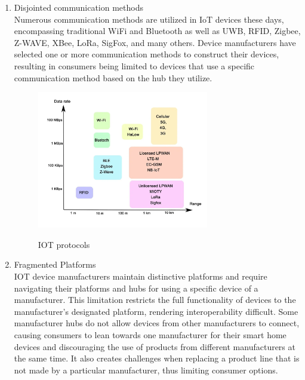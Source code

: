 \begin{enumerate}[label=\alph*]
    \item Disjointed communication methods\\
          Numerous communication methods are utilized in IoT devices these days, encompassing traditional WiFi and Bluetooth as well as UWB, RFID, Zigbee, Z-WAVE, XBee, LoRa, SigFox, and many others. Device manufacturers have selected one or more communication methods to construct their devices, resulting in consumers being limited to devices that use a specific communication method based on the hub they utilize.\\

          \begin{figure}[ht]
              \includegraphics[width=7.5cm]{imgs/introduction/iot-protocols.png}
              \cite{iot-protocols}
              \caption{IOT protocols}
              \renewcommand{\thefigure}{\thesubsection.\arabic{figure}}
          \end{figure}

    \item Fragmented Platforms\\
          IOT device manufacturers maintain distinctive platforms and require navigating their platforms and hubs for using a specific device of a manufacturer. This limitation restricts the full functionality of devices to the manufacturer's designated platform, rendering interoperability difficult. Some manufacturer hubs do not allow devices from other manufacturers to connect, causing consumers to lean towards one manufacturer for their smart home devices and discouraging the use of products from different manufacturers at the same time. It also creates challenges when replacing a product line that is not made by a particular manufacturer, thus limiting consumer options.

\end{enumerate}
